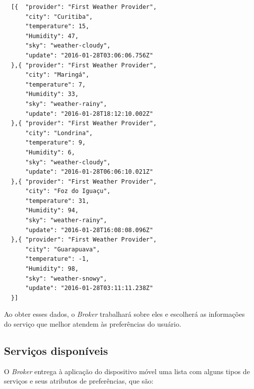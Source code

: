 \begin{footnotesize}
  \begin{verbatim}
  [{  "provider": "First Weather Provider",
      "city": "Curitiba",
      "temperature": 15,
      "Humidity": 47,
      "sky": "weather-cloudy",
      "update": "2016-01-28T03:06:06.756Z"
  },{ "provider": "First Weather Provider",
      "city": "Maringá",
      "temperature": 7,
      "Humidity": 33,
      "sky": "weather-rainy",
      "update": "2016-01-28T18:12:10.002Z"
  },{ "provider": "First Weather Provider",
      "city": "Londrina",
      "temperature": 9,
      "Humidity": 6,
      "sky": "weather-cloudy",
      "update": "2016-01-28T06:06:10.021Z"
  },{ "provider": "First Weather Provider",
      "city": "Foz do Iguaçu",
      "temperature": 31,
      "Humidity": 94,
      "sky": "weather-rainy",
      "update": "2016-01-28T16:08:08.096Z"
  },{ "provider": "First Weather Provider",
      "city": "Guarapuava",
      "temperature": -1,
      "Humidity": 98,
      "sky": "weather-snowy",
      "update": "2016-01-28T03:11:11.238Z"
  }]
  \end{verbatim}
\end{footnotesize}

Ao obter esses dados, o \textit{Broker} trabalhará sobre eles e escolherá as informações do serviço que melhor atendem às preferências do usuário.

\subsection{Serviços disponíveis}
O \textit{Broker} entrega à aplicação do dispositivo móvel uma lista com alguns tipos de serviços e seus atributos de preferências, que são:

